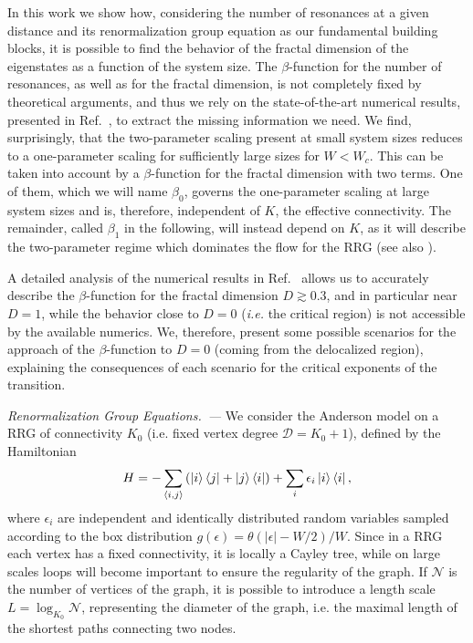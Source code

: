\documentclass[reprint,aps,prl,superscriptaddress,english,nolongbibliography]{revtex4-2}
\begin{document}
In this work we show how, considering the number of resonances at a given distance and its renormalization group equation as our fundamental building blocks, it is possible to find the behavior of the fractal dimension of the eigenstates as a function of the system size. 
The $\beta$-function for the number of resonances, as well as for the fractal dimension, is not completely fixed by theoretical arguments, and thus we rely on the state-of-the-art numerical results, presented in Ref.~\cite{sierant2023universality}, to extract the missing information we need. 
We find, surprisingly, that the two-parameter scaling present at small system sizes reduces to a one-parameter scaling for sufficiently large sizes for $W<W_c$. This can be taken into account by a $\beta$-function for the fractal dimension with two terms. 
One of them, which we will name $\beta_0$, governs the one-parameter scaling at large system sizes and is, therefore, independent of $K$, the effective connectivity. The remainder, called $\beta_1$ in the following, will instead depend on $K$, as it will describe the two-parameter regime which dominates the flow for the RRG (see also \cite{arenz2023wegner,zirnbauer2023wegner}). 

A detailed analysis of the numerical results in Ref.~\cite{sierant2023universality} allows us to accurately describe the $\beta$-function for the fractal dimension $D\gtrsim 0.3$, and in particular near $D=1$, while the behavior close to $D=0$ ({\it i.e.} the critical region) is not accessible by the available numerics. We, therefore, present some possible scenarios for the approach of the $\beta$-function to $D=0$ (coming from the delocalized region), explaining the consequences of each scenario for the critical exponents of the transition.

\emph{Renormalization Group Equations.~---} 
We consider the Anderson model on a RRG of connectivity $K_0$ (i.e. fixed vertex degree $\mathcal{D}=K_0+1$), defined by the Hamiltonian 
\begin{equation}
    H = - \sum_{\langle i,j \rangle} \left( \ket{i}\bra{j} + \ket{j}\bra{i} \right) + \sum_i \epsilon_i \ket{i} \bra{i},
\end{equation}
where $\epsilon_i$ are independent and identically distributed random variables sampled according to the box distribution $g(\epsilon) = \theta(|\epsilon|-W/2)/W$. Since in a RRG each vertex has a fixed connectivity, it is locally a Cayley tree, while on large scales loops will become important to ensure the regularity of the graph. If $\mathcal{N}$ is the number of vertices of the graph, it is possible to introduce a length scale $L = \log_{K_0} \mathcal{N}$, representing the diameter of the graph, i.e. the maximal length of the shortest paths connecting two nodes.
\end{document}
